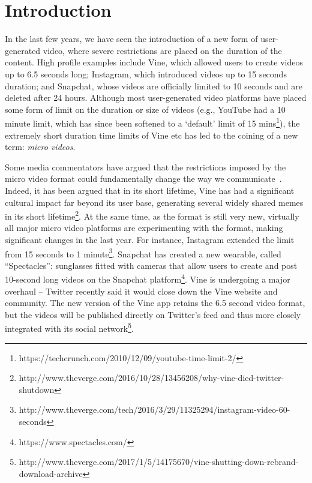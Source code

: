 \section{Introduction}

In the last few years, we have seen the introduction of a new form of user-generated video, where severe restrictions are placed on the duration of the content. High profile examples include Vine, which allowed users to create videos up to 6.5 seconds long;  Instagram, which introduced videos up to 15 seconds duration; and Snapchat, whose videos are officially limited to 10 seconds and are deleted after 24 hours. 
Although most user-generated video platforms have placed some form of limit on the duration or size of videos (e.g., YouTube had a 10 minute limit, which has since been softened to a `default' limit of 15 mins\footnote{\scriptsize https://techcrunch.com/2010/12/09/youtube-time-limit-2/}), the extremely short duration time limits of Vine etc has led to the coining of a new term: \emph{micro videos}. 







Some media commentators have argued that the restrictions imposed by the micro video format could fundamentally change the way we communicate~\cite{bbc}. Indeed, it has been argued that in its short lifetime, Vine has had a significant cultural impact far beyond its user base, generating several widely shared memes in its short lifetime\footnote{\scriptsize http://www.theverge.com/2016/10/28/13456208/why-vine-died-twitter-shutdown}. At the same time, as the format is still very new, virtually all major micro video platforms are experimenting with the format, making significant changes in the last year. For instance, Instagram extended the limit from 15 seconds to 1 minute\footnote{\scriptsize http://www.theverge.com/tech/2016/3/29/11325294/instagram-video-60-seconds}. Snapchat has created a new wearable, called ``Spectacles'':  sunglasses fitted with cameras that allow users to create and post 10-second long videos on the Snapchat platform\footnote{\scriptsize https://www.spectacles.com/}. 
Vine is undergoing a major overhaul -- Twitter recently said it would close down the Vine website and community. The new version of the Vine app retains the 6.5 second video format, but the videos will be published directly on Twitter's feed and thus more closely integrated with its social network\footnote{\scriptsize http://www.theverge.com/2017/1/5/14175670/vine-shutting-down-rebrand-download-archive}. 

